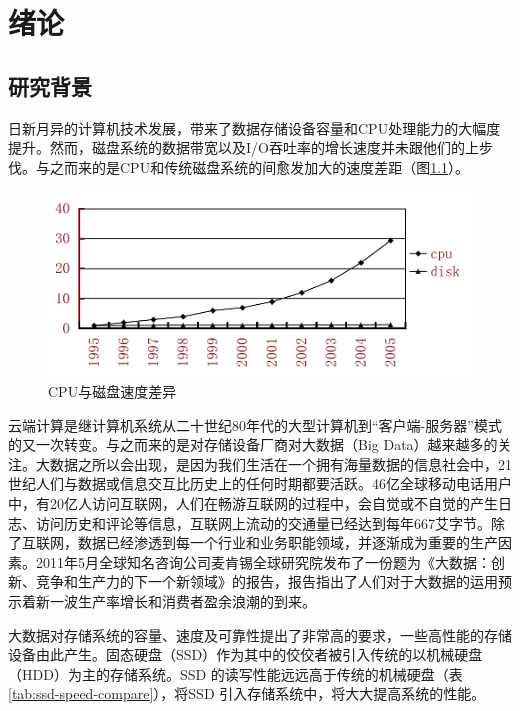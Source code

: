 
\chapter{绪论}
\label{cha:introduction}

\section{研究背景}
\label{sec:background}

日新月异的计算机技术发展，带来了数据存储设备容量和CPU处理能力的大幅度提升。然而，磁盘系统的数据带宽以及I/O吞吐率的增长速度并未跟他们的上步伐。与之而来的是CPU和传统磁盘系统的间愈发加大的速度差距（图\ref{fig:cpu-disk-diff}）。

\begin{figure}[htb]
\centering
\includegraphics[width=0.7\linewidth]{./graph/cpu-disk-gap}
\caption{CPU与磁盘速度差异}
\label{fig:cpu-disk-diff}
\end{figure}

云端计算是继计算机系统从二十世纪80年代的大型计算机到“客户端-服务器”模式的又一次转变。与之而来的是对存储设备厂商对大数据（Big Data）越来越多的关注。大数据之所以会出现，是因为我们生活在一个拥有海量数据的信息社会中，21世纪人们与数据或信息交互比历史上的任何时期都要活跃。46亿全球移动电话用户中，有20亿人访问互联网，人们在畅游互联网的过程中，会自觉或不自觉的产生日志、访问历史和评论等信息，互联网上流动的交通量已经达到每年667艾字节。除了互联网，数据已经渗透到每一个行业和业务职能领域，并逐渐成为重要的生产因素。2011年5月全球知名咨询公司麦肯锡全球研究院发布了一份题为《大数据：创新、竞争和生产力的下一个新领域》的报告，报告指出了人们对于大数据的运用预示着新一波生产率增长和消费者盈余浪潮的到来。

大数据对存储系统的容量、速度及可靠性提出了非常高的要求，一些高性能的存储设备由此产生。固态硬盘（SSD）作为其中的佼佼者被引入传统的以机械硬盘（HDD）为主的存储系统。SSD 的读写性能远远高于传统的机械硬盘（表\ref{tab:ssd-speed-compare}），将SSD 引入存储系统中，将大大提高系统的性能。

